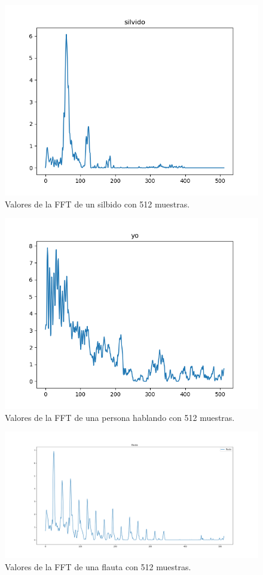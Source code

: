 \documentclass[a4paper, 12pt]{book}
\begin{document}
\begin{figure}
	\centering
	\includegraphics[width=12cm, keepaspectratio]{img/silvido512.png}
	\caption{Valores de la FFT de un silbido con 512 muestras.}\label{fig:silvido}
\end{figure}

\begin{figure}
	\centering
	\includegraphics[width=12cm, keepaspectratio]{img/yo512.png}
	\caption{Valores de la FFT de una persona hablando con 512 muestras.}\label{fig:yo}
\end{figure}

\begin{figure}
	\centering
	\includegraphics[width=12cm, keepaspectratio]{img/flauta512.png}
	\caption{Valores de la FFT de una flauta con 512 muestras.}\label{fig:flauta}
\end{figure}
\end{document}
